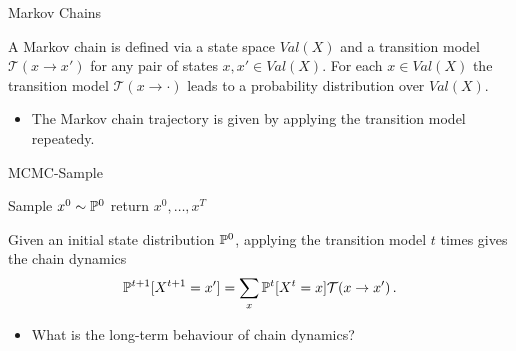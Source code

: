 \begin{frame}{Markov Chains}
\begin{definition}
   A Markov chain is defined via a state space $Val(X)$ and a transition model $\mathcal{T}(x \rightarrow x')$ for any pair of states $x,x' \in Val(X)$.
   For each $x \in Val(X)$ the transition model $\mathcal{T}(x \rightarrow \cdot)$ leads to a probability distribution over $Val(X)$.
\end{definition}
\pause
\begin{itemize}
    \item The Markov chain trajectory is given by applying the transition model repeatedy.
\end{itemize}
\pause
\begin{algorithm}[H]
    \caption{MCMC-Sample}
    \label{alg:mcmc-sample}
    \pause
    Sample $x^0 \sim \Pb^0$\;
    \pause
    \pause
    return $x^0,\ldots,x^T$\;
\end{algorithm}
\pause
\begin{definition}
    Given an initial state distribution $\Pb^0$, applying the transition model $t$ times gives the chain dynamics
    \begin{equation}
        \Pb^{t+1}[X^{t+1} = x'] = \sum_{x} \Pb^t[X^t = x] \mathcal{T}(x \rightarrow x')\,.
    \end{equation}
\end{definition}
\pause
\begin{itemize}
    \item What is the long-term behaviour of chain dynamics?
\end{itemize}
\end{frame}

